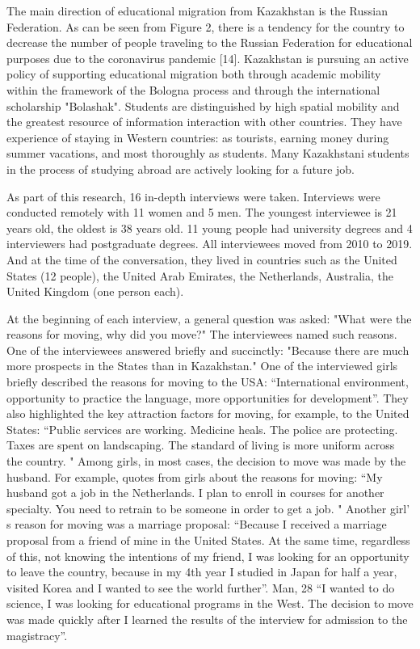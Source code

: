 \begin{multicols}{2}
The main direction of educational migration from Kazakhstan is the
Russian Federation. As can be seen from Figure 2, there is a tendency
for the country to decrease the number of people traveling to the
Russian Federation for educational purposes due to the coronavirus
pandemic {[}14{]}. Kazakhstan is pursuing an active policy of supporting
educational migration both through academic mobility within the
framework of the Bologna process and through the international
scholarship "Bolashak". Students are distinguished by high spatial
mobility and the greatest resource of information interaction with other
countries. They have experience of staying in Western countries: as
tourists, earning money during summer vacations, and most thoroughly as
students. Many Kazakhstani students in the process of studying abroad
are actively looking for a future job.

As part of this research, 16 in-depth interviews were taken. Interviews
were conducted remotely with 11 women and 5 men. The youngest
interviewee is 21 years old, the oldest is 38 years old. 11 young people
had university degrees and 4 interviewers had postgraduate degrees. All
interviewees moved from 2010 to 2019. And at the time of the
conversation, they lived in countries such as the United States (12
people), the United Arab Emirates, the Netherlands, Australia, the
United Kingdom (one person each).

At the beginning of each interview, a general question was asked: "What
were the reasons for moving, why did you move?" The interviewees named
such reasons. One of the interviewees answered briefly and succinctly:
"Because there are much more prospects in the States than in
Kazakhstan." One of the interviewed girls briefly described the reasons
for moving to the USA: ``International environment, opportunity to
practice the language, more opportunities for development''. They also
highlighted the key attraction factors for moving, for example, to the
United States: ``Public services are working. Medicine heals. The police
are protecting. Taxes are spent on landscaping. The standard of living
is more uniform across the country. " Among girls, in most cases, the
decision to move was made by the husband. For example, quotes from girls
about the reasons for moving: ``My husband got a job in the Netherlands.
I plan to enroll in courses for another specialty. You need to retrain
to be someone in order to get a job. " Another girl' s
reason for moving was a marriage proposal: ``Because I received a
marriage proposal from a friend of mine in the United States. At the
same time, regardless of this, not knowing the intentions of my friend,
I was looking for an opportunity to leave the country, because in my 4th
year I studied in Japan for half a year, visited Korea and I wanted to
see the world further''. Man, 28 ``I wanted to do science, I was looking
for educational programs in the West. The decision to move was made
quickly after I learned the results of the interview for admission to
the magistracy''.


\end{multicols}
